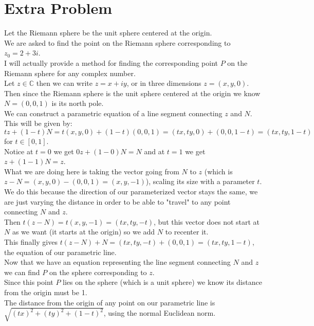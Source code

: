 \documentclass{article}
\begin{document}
\section*{Extra Problem}
\begin{center}
    \doublespacing
    Let the Riemann sphere be the unit sphere centered at the origin.
    \\We are asked to find the point on the Riemann sphere corresponding to $z_0 = 2 + 3i$.
    \\I will actually provide a method for finding the corresponding point $P$ on the Riemann sphere for any complex number.
    \\Let $z\in\mathbb{C}$ then we can write $z = x + iy$, or in three dimensions $z = (x, y, 0)$.
    \\Then since the Riemann sphere is the unit sphere centered at the origin we know $N = (0, 0, 1)$ is its north pole.
    \\We can construct a parametric equation of a line segment connecting $z$ and $N$.
    \\This will be given by: $tz + (1-t)N = t(x, y, 0) + (1-t)(0, 0, 1) = (tx, ty, 0) + (0, 0, 1 - t) = (tx, ty, 1 - t)$ for $t\in [0, 1]$.
    \break
    \\Notice at $t = 0$ we get $0z + (1 - 0)N = N$ and at $t = 1$ we get $z + (1 - 1)N = z$.
    \\What we are doing here is taking the vector going from $N$ to $z$ (which is $z - N = (x, y, 0) - (0, 0, 1) = (x, y, -1)$), scaling its size with a parameter $t$. We do this because the direction of our parameterized vector stays the same, we are just varying the distance in order to be able to "travel" to any point connecting $N$ and $z$.
    \\Then $t(z - N) = t(x, y, -1) = (tx, ty, -t)$, but this vector does not start at $N$ as we want (it starts at the origin) so we add $N$ to recenter it.
    \\This finally gives $t(z - N) + N = (tx, ty, -t) + (0, 0, 1) = (tx, ty, 1 - t)$, the equation of our parametric line.
    \\Now that we have an equation representing the line segment connecting $N$ and $z$ we can find $P$ on the sphere corresponding to $z$.
    \\Since this point $P$ lies on the sphere (which is a unit sphere) we know its distance from the origin must be 1.
    \\The distance from the origin of any point on our parametric line is $\sqrt{(tx)^2 + (ty)^2 + (1 - t)^2}$, using the normal Euclidean norm.

\end{center}
\end{document}
